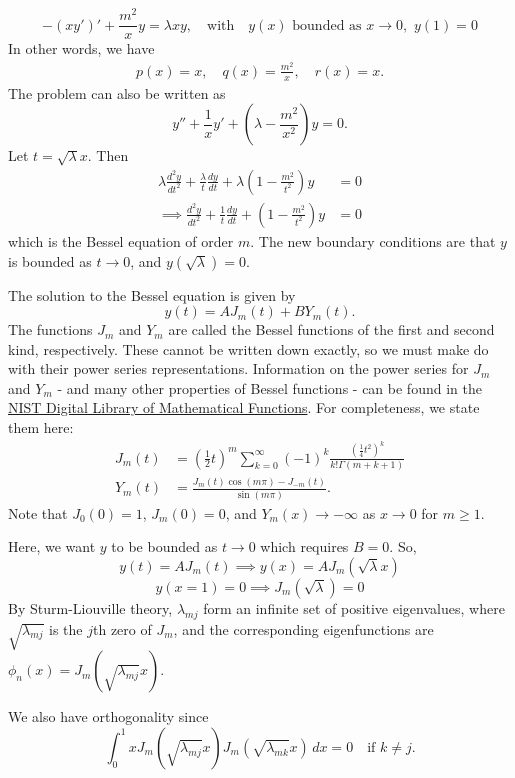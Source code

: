 \begin{eg}\label{eg:bessel}
	\[
	-\left(xy'\right)' + \frac{m^2}{x}y = \lambda xy, \quad\text{with}\quad y(x) \text{ bounded as } x \rightarrow 0, \,\, y(1) = 0
	\]
	In other words, we have
	\begin{align*}
		p(x) = x, \quad q(x) = \frac{m^2}{x}, \quad r(x) = x.
	\end{align*}
	The problem can also be written as 
	\[
	y'' + \frac{1}{x} y' + \left(\lambda - \frac{m^2}{x^2}\right)y = 0.
	\]
	Let $t= \sqrt{\lambda} x$. Then
	\begin{align}
		\lambda\frac{d^2y}{dt^2} + \frac{\lambda}{t} \frac{dy}{dt} + \lambda\left(1- \frac{m^2}{t^2}\right)y &= 0 \nonumber \\
		\label{eq:bessel}\implies \frac{d^2y}{dt^2} + \frac{1}{t} \frac{dy}{dt} + \left(1- \frac{m^2}{t^2}\right)y &= 0
	\end{align}
	which is the Bessel equation of order $m$. The new boundary conditions are that $y$ is bounded as $t \to 0$, and $y(\sqrt{\lambda}) = 0$.
	
	The solution to the Bessel equation is given by
	\[
		y(t) = A J_m(t) + B Y_m(t).
	\]
	The functions $J_m$ and $Y_m$ are called the Bessel functions of the first and second kind, respectively. These cannot be written down exactly, so we must make do with their power series representations. Information on the power series for $J_m$ and $Y_m$ - and many other properties of Bessel functions - can be found in the \href{https://dlmf.nist.gov/}{NIST Digital Library of Mathematical Functions}. For completeness, we state them here:
	\begin{align}
		\label{eq:besselfirstkind}
		J_m(t) &= (\tfrac12 t)^m \sum_{k=0}^{\infty} (-1)^k \frac{(\frac14 t^2)^k}{k!\Gamma(m+k+1)} \\
		Y_m(t) &= \frac{J_m(t)\cos(m\pi) - J_{-m}(t)}{\sin(m\pi)}.
	\end{align}
	Note that $J_0(0) = 1$, $J_m(0)=0$, and $Y_m(x) \to -\infty$ as $x \to 0$ for $m \geq 1$.
	
	Here, we want $y$ to be bounded as $t \rightarrow 0$ which requires $B=0$. So, 
	\[
		y(t) = A J_m(t) \implies y(x) = A J_m(\sqrt{\lambda}x) 
	\]
	\[
		y(x=1) = 0 \implies J_m(\sqrt{\lambda}) = 0
	\]
	By Sturm-Liouville theory, $\lambda_{mj}$ form an infinite set of positive eigenvalues, where $\sqrt{\lambda_{mj}}$ is the $j$th zero of $J_m$, and the corresponding eigenfunctions are $\phi_n(x) = J_m(\sqrt{\lambda_{mj}}x)$.
	
	We also have orthogonality since
	\[
		\int_0^1 x J_m (\sqrt{\lambda_{mj}} x) J_m (\sqrt{\lambda_{mk}} x) \,dx = 0 \quad \text{if } k \neq j.
	\]
\end{eg}

